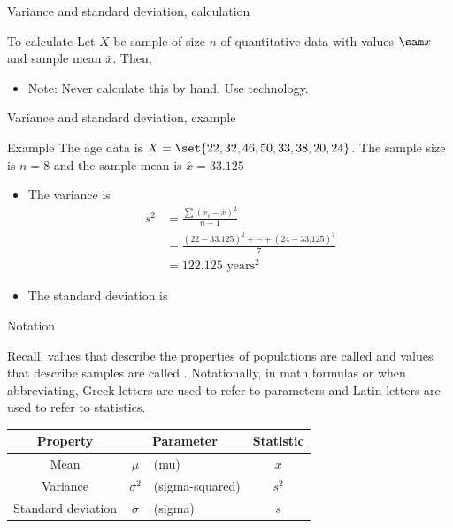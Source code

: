 \documentclass[xcolor=table, aspectratio=169, bigger, handout]{beamer}
\begin{document}
\begin{frame}{Variance and standard deviation, calculation}
\begin{block}{To calculate}
Let $X$ be sample of size $n$ of quantitative data with values $\sam x$ and sample mean $\bar x$. Then,\\
\smallskip
{}
\begin{itemize}
\pause\item Note: Never calculate this by hand. Use technology.
\end{itemize}
\end{block}
\end{frame}

\begin{frame}{Variance and standard deviation, example}
\begin{exampleblock}{Example}
The age data is $X = \set{22, 32, 46, 50, 33, 38, 20, 24}$. The sample size is $n=8$ and the sample mean is $\bar x = 33.125$
\begin{itemize}
\pause
\item The variance is \vspace{-.1in}
\begin{align*}
s^2 &= \frac{\sum (x_i - \bar x)^2}{n-1}\\
&= \frac{(22-33.125)^2 + \cdots + (24-33.125)^2}{7}\\
&= 122.125 \text{ years}^\text{2}
\end{align*} \vspace{-.2in}
\pause\item The standard deviation is\\ \smallskip
{}
\end{itemize}
\smallskip
\end{exampleblock}
\end{frame}


\begin{frame}{Notation}
\begin{block}{}
Recall, values that describe the properties of populations are called  and values that describe samples are called . Notationally, in math formulas or when abbreviating, Greek letters are used to refer to parameters and Latin letters are used to refer to statistics.
\pause
\begin{center}
\begin{tabular}{c |c l | c}
Property & \multicolumn{2}{c|}{Parameter} & Statistic\\
\hline
Mean & $\mu$ & (mu) & $\bar x$\\
Variance & $\sigma^2$ &(sigma-squared) & $s^2$\\
Standard deviation & $\sigma$ &(sigma) & $s$
\end{tabular}
\end{center} 
\end{block}
\end{frame}
\end{document}
